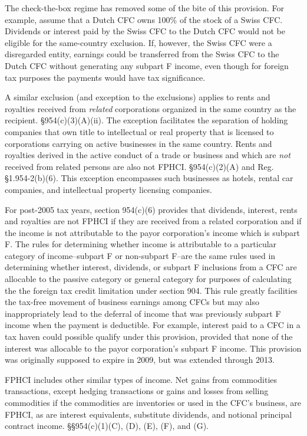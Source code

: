 The check-the-box regime has removed some of the bite of this provision.  For example, assume that a Dutch CFC owns 100\% of the stock of a Swiss CFC.  Dividends or interest paid by the Swiss CFC to the Dutch CFC would not be eligible for the same-country exclusion.  If, however, the Swiss CFC were a disregarded entity, earnings could be transferred from the Swiss CFC to the Dutch CFC without generating any subpart F income, even though for foreign tax purposes the payments would have tax significance.  

A similar exclusion (and exception to the exclusions) applies to rents and royalties received from \emph{related} corporations organized in the same country as the recipient.  \S 954(c)(3)(A)(ii).  The exception facilitates the separation of holding companies that own title to intellectual or real property that is licensed to corporations carrying on active businesses in the same country.  Rents and royalties derived in the active conduct of a trade or business and which are \emph{not} received from related persons are also not FPHCI.  \S 954(c)(2)(A) and Reg. \S1.954-2(b)(6).  This exception encompasses such businesses as hotels, rental car companies, and intellectual property licensing companies.  

For post-2005 tax years, section 954(c)(6) provides that dividends, interest, rents and royalties are not FPHCI if they are received from a related corporation and if the income is not attributable to the payor corporation's income which is subpart F.  The rules for determining whether income is attributable to a particular category of income--subpart F or non-subpart F--are the same rules used in determining whether interest, dividends, or subpart F inclusions from a CFC are allocable to the passive category or general category for purposes of calculating the the foreign tax credit limitation under section 904.  This rule greatly facilities the tax-free movement of business earnings among CFCs but may also inappropriately lead to the deferral of income that was previously subpart F income when the payment is deductible.  For example, interest paid to a CFC in a tax haven could possible qualify under this provision, provided that none of the interest was allocable to the payor corporation's subpart F income.  This provision was originally supposed to expire in 2009, but was extended through 2013.               

FPHCI includes other similar types of income.  Net gains from commodities transactions, except hedging transactions or gains and losses from selling commodities if the commodities are inventories or used in the CFC's business, are FPHCI, as are interest equivalents, substitute dividends, and notional principal contract income.  \S\S 954(c)(1)(C), (D), (E), (F), and (G).

